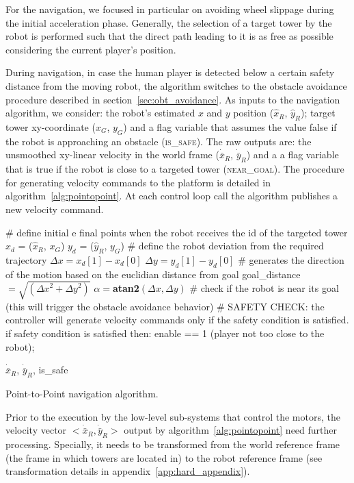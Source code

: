 For the navigation, we focused in particular on avoiding wheel slippage during the initial acceleration phase. Generally, the selection of a target tower by the robot is performed such that the direct path leading to it is as free as possible considering the current player's position. 

During navigation, in case the human player is detected below a certain safety distance from the moving robot, the algorithm switches to the obstacle avoidance procedure described in section~\ref{sec:obt_avoidance}. As inputs to the navigation algorithm, we consider: the robot's estimated $x$ and $y$ position ($\hat{x}_R$, $\hat{y}_R$); target tower xy-coordinate ($x_G$, $y_G$) and a flag variable that assumes the value false if the robot is approaching an obstacle (\textsc{is\_safe}). The raw outputs are: the unsmoothed xy-linear velocity in the world frame ($\dot{\bar{x}}_R$, $\dot{\bar{y}}_R$) and a a flag variable that is true if the robot is close to a targeted tower (\textsc{near\_goal}). The procedure for generating velocity commands to the platform is detailed in algorithm~\ref{alg:pointopoint}. At each control loop call the algorithm publishes a new velocity command.

\begin{algorithm}[ht]
	\# define initial e final points when the robot receives the id of the targeted tower \;
	$x_d$ = ($\hat{x}_R$, $x_G$)\;
	$y_d$ = ($\hat{y}_R$, $y_G$)\;
	\# define the robot deviation from the required trajectory\;
	$\Delta x = x_d[1] - x_d[0]$\;
	$\Delta y = y_d[1] - y_d[0]$\;
	\# generates the direction of the motion based on the euclidian distance from goal\;
	goal\_distance$ = \sqrt{({\Delta x}^2 + {\Delta y}^2)}$\;
	$\alpha = $\textbf{atan2}$(\Delta x, \Delta y)$\;
	\# check if the robot is near its goal (this will trigger the obstacle avoidance behavior)\;
	\# SAFETY CHECK: the controller will generate velocity commands only if the safety condition is satisfied. if safety condition is satisfied then: enable == 1 (player not too close to the robot);\;
	
	\Return $\dot{\bar{x}}_R$, $\dot{\bar{y}}_R$, is\_safe 
	\caption{Point-to-Point navigation algorithm.}
	\label{alg:pointopoint}
\end{algorithm}

Prior to the execution by the low-level sub-systems that control the motors, the velocity vector $<\dot{\bar{x}}_R,\dot{\bar{y}}_R>$ output by algorithm~\ref{alg:pointopoint} need further processing. Specially, it needs to be transformed from the world reference frame (the frame in which towers are located in) to the robot reference frame (see transformation details in appendix~\ref{app:hard_appendix}).

